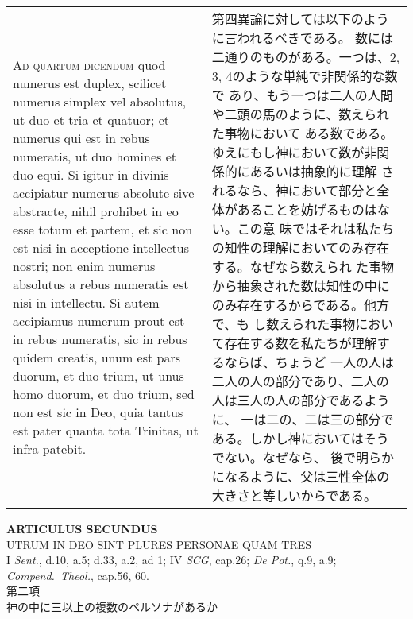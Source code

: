 \documentclass[10pt]{jsarticle} %
\begin{document}
\begin{longtable}{p{21em}p{21em}}
\\



{\scshape Ad quartum dicendum} quod numerus est duplex, scilicet numerus simplex
vel absolutus, ut duo et tria et quatuor; et numerus qui est in rebus
numeratis, ut duo homines et duo equi. Si igitur in divinis accipiatur
numerus absolute sive abstracte, nihil prohibet in eo esse totum et
partem, et sic non est nisi in acceptione intellectus nostri; non enim
numerus absolutus a rebus numeratis est nisi in intellectu. Si autem
accipiamus numerum prout est in rebus numeratis, sic in rebus quidem
creatis, unum est pars duorum, et duo trium, ut unus homo duorum, et
duo trium, sed non est sic in Deo, quia tantus est pater quanta tota
Trinitas, ut infra patebit.


&

第四異論に対しては以下のように言われるべきである。
数には二通りのものがある。一つは、2, 3, 4のような単純で非関係的な数で
 あり、もう一つは二人の人間や二頭の馬のように、数えられた事物において
 ある数である。ゆえにもし神において数が非関係的にあるいは抽象的に理解
 されるなら、神において部分と全体があることを妨げるものはない。この意
 味ではそれは私たちの知性の理解においてのみ存在する。なぜなら数えられ
 た事物から抽象された数は知性の中にのみ存在するからである。他方で、も
 し数えられた事物において存在する数を私たちが理解するならば、ちょうど
 一人の人は二人の人の部分であり、二人の人は三人の人の部分であるように、
 一は二の、二は三の部分である。しかし神においてはそうでない。なぜなら、
 後で明らかになるように、父は三性全体の大きさと等しいからである。


\end{longtable}
\newpage


\begin{center}
{\Large {\bf ARTICULUS SECUNDUS}}\\
{\large UTRUM IN DEO SINT PLURES PERSONAE QUAM TRES}\\
 {\footnotesize I {\itshape Sent.}, d.10, a.5; d.33, a.2, ad 1; IV
 {\itshape SCG}, cap.26; {\itshape De Pot.}, q.9, a.9; {\itshape
 Compend.~Theol.}, cap.56, 60.}\\
{\Large 第二項\\神の中に三以上の複数のペルソナがあるか}
\end{center}
\end{document}
